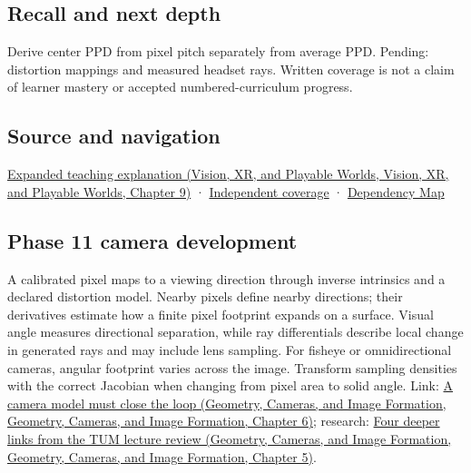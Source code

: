 \subsection{Recall and next depth}\label{appendix-7d356c396d1a-recall-and-next-depth}

Derive center PPD from pixel pitch separately from average PPD. Pending: distortion mappings and measured headset rays. Written coverage is not a claim of learner mastery or accepted numbered-curriculum progress.

\subsection{Source and navigation}\label{appendix-7d356c396d1a-source-and-navigation}

\href{../07-Vision-XR-and-Playable-Worlds/main.pdf\#nameddest=04-visual-computing-ii-ch042-angles-connect-display-samples-to-a-viewer}{Expanded teaching explanation (Vision, XR, and Playable Worlds, Vision, XR, and Playable Worlds, Chapter 9)} · \hyperref[appendix-fd090d982a15-xr01---independent-seeing-and-representation-source]{Independent coverage} · \hyperref[appendix-4ad47bdd269a]{Dependency Map}

\subsection{Phase 11 camera development}\label{appendix-7d356c396d1a-phase-11-camera-development}

A calibrated pixel maps to a viewing direction through inverse intrinsics and a declared distortion model. Nearby pixels define nearby directions; their derivatives estimate how a finite pixel footprint expands on a surface. Visual angle measures directional separation, while ray differentials describe local change in generated rays and may include lens sampling. For fisheye or omnidirectional cameras, angular footprint varies across the image. Transform sampling densities with the correct Jacobian when changing from pixel area to solid angle. Link: \href{../03-Geometry-Cameras-and-Image-Formation/main.pdf\#nameddest=02-foundations-ii-ch037-a-camera-model-must-close-the-loop}{A camera model must close the loop (Geometry, Cameras, and Image Formation, Geometry, Cameras, and Image Formation, Chapter 6)}; research: \href{../03-Geometry-Cameras-and-Image-Formation/main.pdf\#nameddest=02-foundations-ii-ch036-four-deeper-links-from-the-tum-lecture-review}{Four deeper links from the TUM lecture review (Geometry, Cameras, and Image Formation, Geometry, Cameras, and Image Formation, Chapter 5)}.

